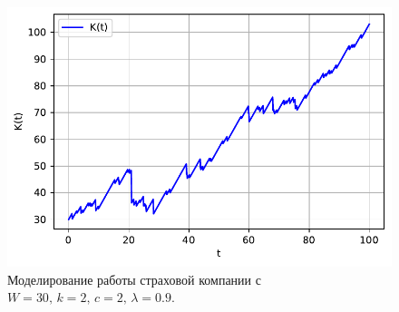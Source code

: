 \documentclass[16pt]{article}
\begin{document}
\begin{figure}
	\center
	\includegraphics[scale=0.7]{11_7.pdf}
	\caption{Моделирование работы страховой компании с $W = 30,\, k = 2,\, c = 2,\, \lambda = 0.9$.}
\end{figure}
\end{document}
